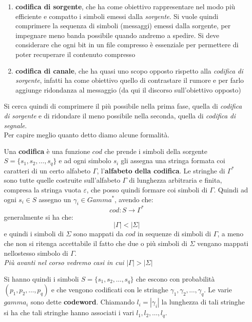 \documentclass[a4paper,12pt, oneside]{book}
\begin{document}
\begin{enumerate}
  \item \textbf{codifica di sorgente}, che ha come obiettivo rappresentare nel
  modo più efficiente e compatto i simboli emessi dalla \textit{sorgente}. Si
  vuole quindi comprimere la sequenza di simboli (messaggi) emessi dalla
  sorgente, per impegnare meno banda possibile quando andremo a spedire. Si deve
  considerare che ogni bit in un file 
  compresso è essenziale per permettere di poter recuperare il contenuto
  compresso 
  \item \textbf{codifica di canale}, che ha quasi uno scopo opposto rispetto
  alla \textit{codifica di sorgente}, infatti ha come obiettivo quello di
  contrastare il rumore e per farlo aggiunge ridondanza al messaggio (da qui il
  discorso sull'obiettivo opposto)
\end{enumerate}
Si cerca quindi di comprimere il più possibile nella prima fase, quella di
\textit{codifica di sorgente} e di ridondare il meno possibile nella seconda,
quella di \textit{codifica di segnale}.\\
Per capire meglio quanto detto diamo alcune formalità.
\begin{definizione}
  Una \textbf{codifica} è una funzione $cod$ che prende i simboli della sorgente
  $S=\{s_1, s_2,\ldots,s_q\}$ e ad ogni simbolo $s_i$ gli assegna una stringa
  formata coi caratteri di un certo alfabeto $\Gamma$, l'\textbf{alfabeto
    della codifica}. Le stringhe di $\Gamma^*$ sono tutte quelle costruite
  sull'alfabeto $\Gamma$ di lunghezza arbitraria e finita, compresa la stringa
  vuota $\varepsilon$, che posso quindi formare coi simboli di $\Gamma$. Quindi
  ad ogni $s_i\in S$ assegno un $\gamma_i\in Gamma^*$, avendo che:
  \[cod:S\to \Gamma^*\]
  generalmente si ha che:
  \[|\Gamma|<|\Sigma|\]
  e quindi i simboli di $\Sigma$ sono mappati da $cod$ in  sequenze  di  simboli
  di $\Gamma$, a meno che non si ritenga accettabile il fatto che due o più
  simboli di $\Sigma$ vengano mappati nellostesso simbolo di $\Gamma$. \\
  \textit{Più avanti nel corso vedremo casi in cui $|\Gamma|>|\Sigma|$}
\end{definizione}
Si hanno quindi i simboli $S=\{s_1, s_2,\ldots,s_q\}$ che escono con
probabilità $(p_1,p_2,\ldots,p_q)$ e che vengono codificati con le stringhe
$\gamma_1,\gamma_2,\ldots,\gamma_q$. Le varie $gamma_i$ sono dette
\textbf{codeword}. Chiamando $l_i=|\gamma_i|$ la lunghezza 
di tali stringhe si ha che tali stringhe hanno associati i vari
$l_1,l_2,\ldots,l_q$.\\
\end{document}
